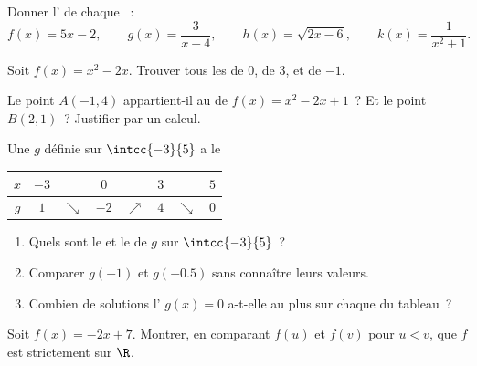 \begin{exercise}[$\star$]\label{exo:g10:functions:2}
Donner l' de chaque ~:
\[
f(x) = 5x - 2, \qquad
g(x) = \frac{3}{x + 4}, \qquad
h(x) = \sqrt{2x - 6}, \qquad
k(x) = \frac{1}{x^2 + 1}.
\]
\end{exercise}

\begin{exercise}[$\star$]\label{exo:g10:functions:3}
Soit $f(x) = x^2 - 2x$. Trouver tous les  de $0$, de $3$, et
de $-1$.
\end{exercise}

\begin{exercise}[$\star$]\label{exo:g10:functions:4}
Le point $A(-1, 4)$ appartient-il au  de
$f(x) = x^2 - 2x + 1$~? Et le point $B(2, 1)$~? Justifier par un calcul.
\end{exercise}

\begin{exercise}[$\star$]\label{exo:g10:functions:5}
Une  $g$ définie sur $\intcc{-3}{5}$ a le 
\begin{center}
\renewcommand{\arraystretch}{1.3}
\begin{tabular}{c|ccccccc}
$x$ & $-3$ & & $0$ & & $3$ & & $5$ \\
\hline
$g$ & $1$ & $\searrow$ & $-2$ & $\nearrow$ & $4$ & $\searrow$ & $0$ \\
\end{tabular}
\end{center}
\begin{enumerate}
  \item Quels sont le  et le  de $g$ sur $\intcc{-3}{5}$~?
  \item Comparer $g(-1)$ et $g(-0.5)$ sans connaître leurs valeurs.
  \item Combien de solutions l' $g(x) = 0$ a-t-elle au plus sur
        chaque  du tableau~?
\end{enumerate}
\end{exercise}

\begin{exercise}[$\star\star$]\label{exo:g10:functions:6}
Soit $f(x) = -2x + 7$. Montrer, en comparant $f(u)$ et $f(v)$ pour
$u < v$, que $f$ est strictement  sur $\R$.
\end{exercise}

